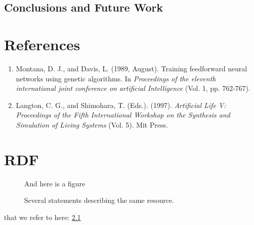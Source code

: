 \documentclass[a4paper,11pt]{kth-mag}
\begin{document}
\section{Conclusions and Future Work}

\chapter*{References}
\begin{enumerate}
\item Montana, D. J.,  and Davis, L. (1989, August). Training feedforward neural networks using genetic algorithms. In \emph{Proceedings of the eleventh international joint conference on artificial Intelligence} (Vol. 1, pp. 762-767).
\item Langton, C. G., and Shimohara, T. (Eds.). (1997). \emph{Artificial Life V: Proceedings of the Fifth International Workshop on the Synthesis and Simulation of Living Systems} (Vol. 5). Mit Press.
\end{enumerate}

\appendix
\addappheadtotoc
\chapter{RDF}\label{appA}

\begin{figure}[ht]
\begin{center}
And here is a figure
\caption{\small{Several statements describing the same resource.}}\label{RDF_4}
\end{center}
\end{figure}

that we refer to here: \ref{RDF_4}
\end{document}
